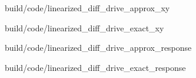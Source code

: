 \begin{bookfigure}
  \begin{minisvg}{build/code/linearized_diff_drive_approx_xy}
    \caption{Linearized differential dirve controller x-y plot (approximate)}
    \label{fig:linearized_diff_drive_approx_xy}
  \end{minisvg}
  \hfill
  \begin{minisvg}{build/code/linearized_diff_drive_exact_xy}
    \caption{Linearized differential drive controller x-y plot (exact)}
    \label{fig:linearized_diff_drive_exact_xy2}
  \end{minisvg}
  \hfill
  \begin{minisvg}{build/code/linearized_diff_drive_approx_response}
    \caption{Linearized differential drive controller response (approximate)}
    \label{fig:linearized_diff_drive_approx_response}
  \end{minisvg}
  \hfill
  \begin{minisvg}{build/code/linearized_diff_drive_exact_response}
    \caption{Linearized differential drive controller response (exact)}
    \label{fig:linearized_diff_drive_exact_response2}
  \end{minisvg}
\end{bookfigure}
